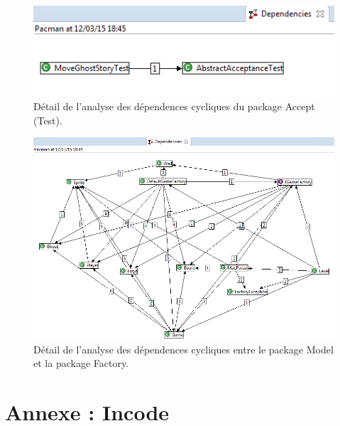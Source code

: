 \documentclass[12pt,a4paper,final]{article}
\begin{document}
\begin{figure}[ht]
	\centering
	\includegraphics[width=\textwidth]{images/DependenciesAcceptTest.png}
	\caption{\label{dependenciesAT}Détail de l'analyse des dépendences cycliques du package Accept (Test).}
\end{figure}

\begin{figure}[ht]
	\centering
	\includegraphics[width=\textwidth]{images/DependenciesModel_Factory.png} %
	\caption{\label{dependenciesMF}Détail de l'analyse des dépendences cycliques entre le package Model et la package Factory.} %
\end{figure}


\clearpage
\newpage
\section{Annexe : Incode}\label{InCode}
\end{document}
